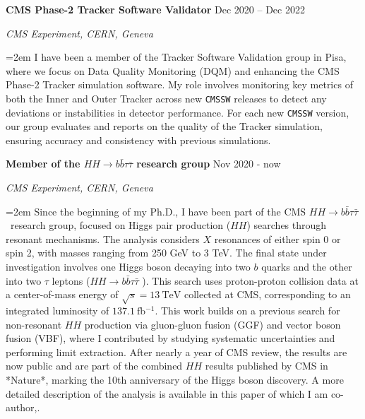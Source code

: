 \documentclass[fontsize=12pt]{article} %
\newcommand{\hhbbtt}{$ HH \rightarrow b\bar{b}\tau\bar{\tau}$ }
\newcommand{\sepspace}{\vspace*{1em}}		%
\newcommand{\EducationEntry}[4]{
	\noindent \textbf{#1} \hfill      %
	{#2} \par  %
	\noindent \textit{#3} \par        %
	\noindent\hangindent=2em\hangafter=0 \small #4 %
	\normalsize \par}
\begin{document}
	 \sepspace
    \EducationEntry{CMS Phase-2 Tracker Software Validator}{Dec 2020 {--} Dec 2022}{CMS Experiment, CERN, Geneva}{I have been a member of the Tracker Software Validation group in Pisa, where we focus on Data Quality Monitoring (DQM) and enhancing the CMS Phase-2 Tracker simulation software. My role involves monitoring key metrics of both the Inner and Outer Tracker across new \texttt{CMSSW} releases to detect any deviations or instabilities in detector performance. For each new \texttt{CMSSW} version, our group evaluates and reports on the quality of the Tracker simulation, ensuring accuracy and consistency with previous simulations.}
    \sepspace
    \EducationEntry{Member of the \hhbbtt \;research group}{Nov 2020 - now}{CMS Experiment, CERN, Geneva}{Since the beginning of my Ph.D., I have been part of the CMS \hhbbtt \, research group, focused on Higgs pair production (\(HH\)) searches through resonant mechanisms. The analysis considers \(X\) resonances of either spin 0 or spin 2, with masses ranging from 250 GeV to 3 TeV. The final state under investigation involves one Higgs boson decaying into two \(b\) quarks and the other into two \(\tau\) leptons (\hhbbtt). This search uses proton-proton collision data at a center-of-mass energy of \(\sqrt{s} = \SI{13}{\tera \electronvolt}\) collected at CMS, corresponding to an integrated luminosity of \(\SI{137.1}{\femto\barn^{-1}}\). This work builds on a previous search for non-resonant \(HH\) production via gluon-gluon fusion (GGF) and vector boson fusion (VBF), where I contributed by studying systematic uncertainties and performing limit extraction. After nearly a year of CMS review, the results are now public and are part of the combined \(HH\) results published by CMS in *Nature*, marking the 10th anniversary of the Higgs boson discovery. A more detailed description of the analysis is available in this paper of which I am co-author,\;\cite{bbttananote}.}
    \sepspace
\end{document}
